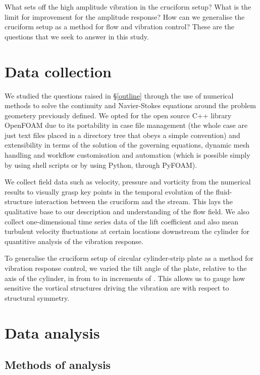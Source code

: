\documentclass[a4paper]{article}
\begin{document}
What sets off the high amplitude vibration in the cruciform setup? What is the limit for improvement for the amplitude response? How can we generalise the cruciform setup as a method for flow and vibration control? These are the questions that we seek to answer in this study.

\section{Data collection} \label{collection}
We studied the questions raised in \S\ref{outline} through the use of numerical methods to solve the continuity and Navier-Stokes equations around the problem geometery previously defined. We opted for the open source C++ library OpenFOAM due to its portability in case file management (the whole case are just text files placed in a directory tree that obeys a simple convention) and extensibility in terms of the solution of the governing equations, dynamic mesh handling and workflow customisation and automation (which is possible simply by using shell scripts or by using Python, through PyFOAM).

We collect field data such as velocity, pressure and vorticity from the numerical results to visually grasp key points in the temporal evolution of the fluid-structure interaction between the cruciform and the stream. This lays the qualitative base to our description and understanding of the flow field. We also collect one-dimensional time series data of the lift coefficient and also mean turbulent velocity fluctuations at certain locations downstream the cylinder for quantitive analysis of the vibration response.

To generalise the cruciform setup of circular cylinder-strip plate as a method for vibration response control, we varied the tilt angle of the plate, relative to the axis of the cylinder, in from \rze{} to \rfo{} in increments of \ron{}. This allows us to gauge how sensitive the vortical structures driving the vibration are with respect to structural symmetry.

\section{Data analysis} \label{analysis}

\subsection{Methods of analysis}
\end{document}
